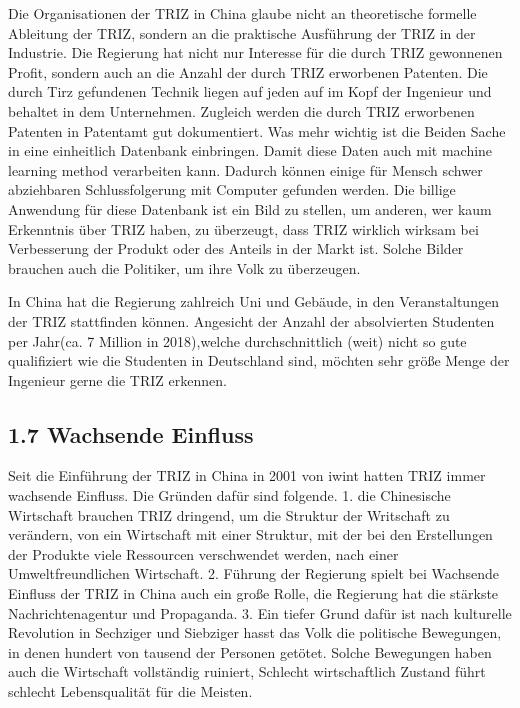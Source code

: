 \documentclass[11pt,a4paper]{article}
\begin{document}
Die Organisationen der TRIZ in China glaube nicht an theoretische formelle
Ableitung der TRIZ, sondern an die praktische Ausführung der TRIZ in der
Industrie. Die Regierung hat nicht nur Interesse für die durch TRIZ
gewonnenen Profit, sondern auch an die Anzahl der  durch TRIZ erworbenen
Patenten. Die durch Tirz gefundenen Technik liegen auf jeden auf im Kopf der
Ingenieur und behaltet in dem Unternehmen. Zugleich werden die durch TRIZ
erworbenen Patenten in Patentamt gut dokumentiert. Was mehr wichtig ist die
Beiden Sache in eine einheitlich Datenbank einbringen. Damit diese Daten auch
mit machine learning method verarbeiten kann. Dadurch können einige für
Mensch schwer abziehbaren Schlussfolgerung mit Computer gefunden  werden. Die
billige Anwendung für diese Datenbank ist ein Bild zu stellen, um anderen, wer
kaum Erkenntnis über  TRIZ haben, zu überzeugt,  dass TRIZ wirklich wirksam
bei Verbesserung der Produkt oder des Anteils in der Markt ist. Solche Bilder
brauchen auch die Politiker, um ihre Volk zu überzeugen.   

In China hat die Regierung zahlreich Uni und Gebäude, in den Veranstaltungen
der TRIZ stattfinden können. Angesicht der Anzahl der absolvierten Studenten
per Jahr(ca. 7 Million in 2018),welche durchschnittlich (weit) nicht so gute
qualifiziert wie die Studenten in Deutschland sind, möchten  sehr größe Menge
der Ingenieur  gerne die TRIZ erkennen.  
  
\subsection{1.7 Wachsende Einfluss}

Seit die Einführung der TRIZ in China in 2001 von iwint hatten TRIZ immer
wachsende Einfluss. Die Gründen dafür sind folgende. 1. die Chinesische
Wirtschaft brauchen TRIZ dringend, um die Struktur der Writschaft zu
verändern,  von ein Wirtschaft mit einer Struktur, mit der bei den
Erstellungen der Produkte viele Ressourcen verschwendet werden,  nach einer
Umweltfreundlichen Wirtschaft. 2. Führung der Regierung spielt bei Wachsende
Einfluss der TRIZ in China auch ein große Rolle, die Regierung hat die
stärkste Nachrichtenagentur und Propaganda. 3. Ein tiefer Grund dafür ist nach
kulturelle Revolution in Sechziger und Siebziger hasst das Volk die politische
Bewegungen, in denen hundert von tausend der Personen getötet. Solche
Bewegungen haben auch die Wirtschaft vollständig ruiniert, Schlecht
wirtschaftlich Zustand führt schlecht Lebensqualität für die Meisten. 
\end{document}
